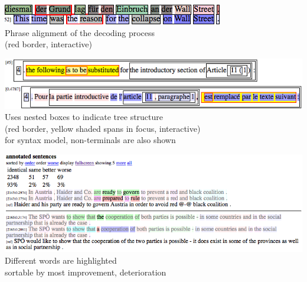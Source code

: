 \documentclass[landscape]{uedslides2C}
\begin{document}

\vspace{30mm}
\begin{center}
\includegraphics[scale=1.5]{analysis-alignment.png}\\[10mm]
Phrase alignment of the decoding process\\[5mm]
(red border, interactive)
\end{center}


\vspace{15mm}
\begin{center}
\includegraphics[scale=1.2]{analysis-tree-alignment.png}\\[10mm]
Uses nested boxes to indicate tree structure\\[3mm]
(red border, yellow shaded spans in focus, interactive)\\[3mm]
for syntax model, non-terminals are also shown
\end{center}


\begin{center}
\includegraphics[scale=1]{analysis-comparison.png}\\[10mm]
Different words are highlighted\\[3mm]
sortable by most improvement, deterioration
\end{center}
\end{document}
